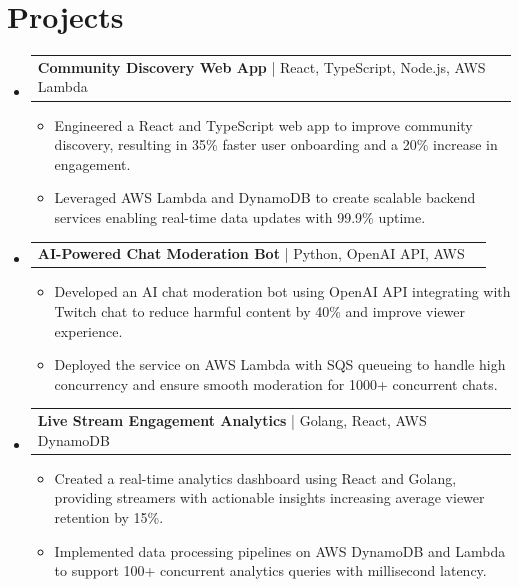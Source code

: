 \documentclass[letterpaper,11pt]{article}
\makeatletter
\newcommand{\resumeItem}[1]{
  \item\footnotesize{
    {#1 \vspace{-2pt}}
  }
}
\newcommand{\resumeProjectHeading}[2]{
    \item
    \begin{tabular*}{1.001\textwidth}{l@{\extracolsep{\fill}}r}
      \small#1 & \textbf{\small #2}\\
    \end{tabular*}\vspace{-7pt}
}
\newcommand{\resumeSubHeadingListStart}{\begin{itemize}[leftmargin=0pt, label={}]}
\newcommand{\resumeSubHeadingListEnd}{\end{itemize}}
\newcommand{\resumeItemListStart}{\begin{itemize}[leftmargin=*]}
\newcommand{\resumeItemListEnd}{\end{itemize}\vspace{-5pt}}
\makeatother
\begin{document}
\section{Projects}
    \vspace{-5pt}
    \resumeSubHeadingListStart
      \resumeProjectHeading
          {\textbf{Community Discovery Web App} | React, TypeScript, Node.js, AWS Lambda}{}
          \resumeItemListStart
              \resumeItem{Engineered a React and TypeScript web app to improve community discovery, resulting in 35\% faster user onboarding and a 20\% increase in engagement.}
              \resumeItem{Leveraged AWS Lambda and DynamoDB to create scalable backend services enabling real-time data updates with 99.9\% uptime.}
          \resumeItemListEnd
          \vspace{-12pt}
      \resumeProjectHeading
          {\textbf{AI-Powered Chat Moderation Bot} | Python, OpenAI API, AWS}{}
          \resumeItemListStart
              \resumeItem{Developed an AI chat moderation bot using OpenAI API integrating with Twitch chat to reduce harmful content by 40\% and improve viewer experience.}
              \resumeItem{Deployed the service on AWS Lambda with SQS queueing to handle high concurrency and ensure smooth moderation for 1000+ concurrent chats.}
          \resumeItemListEnd
          \vspace{-12pt}
      \resumeProjectHeading
          {\textbf{Live Stream Engagement Analytics} | Golang, React, AWS DynamoDB}{}
          \resumeItemListStart
              \resumeItem{Created a real-time analytics dashboard using React and Golang, providing streamers with actionable insights increasing average viewer retention by 15\%.}
              \resumeItem{Implemented data processing pipelines on AWS DynamoDB and Lambda to support 100+ concurrent analytics queries with millisecond latency.}
          \resumeItemListEnd 
    \resumeSubHeadingListEnd
\end{document}
